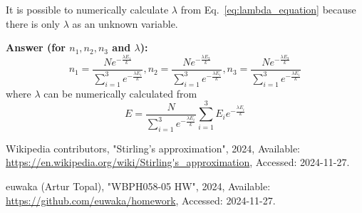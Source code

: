 \documentclass{article}
\begin{document}
It is possible to numerically calculate $\lambda$ from Eq.~\eqref{eq:lambda_equation} because there is only $\lambda$ as an unknown variable.

\hfill \break

\textbf{Answer (for $n_1, n_2, n_3$ and $\lambda$):}
\begin{equation*}
  n_1 = \frac{N e^{-\frac{\lambda E_1}{k}}}{\sum_{i=1}^{3} e^{-\frac{\lambda E_i}{k}}},
  n_2 = \frac{N e^{-\frac{\lambda E_2}{k}}}{\sum_{i=1}^{3} e^{-\frac{\lambda E_i}{k}}},
  n_3 = \frac{N e^{-\frac{\lambda E_3}{k}}}{\sum_{i=1}^{3} e^{-\frac{\lambda E_i}{k}}}
\end{equation*} where $\lambda$ can be numerically calculated from
\begin{equation*}
E = \frac{N}{\sum_{i=1}^{3} e^{-\frac{\lambda E_i}{k}}} \sum_{i=1}^{3}{ E_ie^{-\frac{\lambda E_i}{k}}}
\end{equation*}

\begin{thebibliography}{99}

{Wikipedia contributors}, "{Stirling's approximation}", 2024, Available: \url{https://en.wikipedia.org/wiki/Stirling's_approximation}, Accessed: 2024-11-27.

{euwaka (Artur Topal)}, "WBPH058-05 HW", 2024, Available: \url{https://github.com/euwaka/homework}, Accessed: 2024-11-27.
  
\end{thebibliography}
\end{document}
